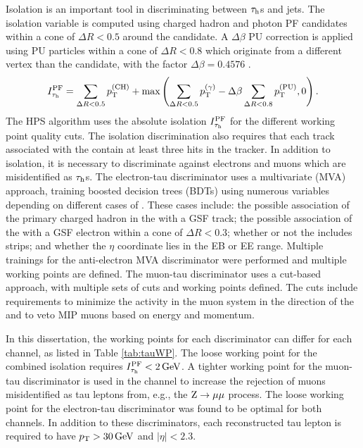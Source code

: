Isolation is an important tool in discriminating between $\tau_{\text{h}}$s and jets. The isolation variable is computed using charged hadron and photon PF candidates within a cone of $\Delta R < 0.5$ around the \tauh candidate. A $\Delta\beta$ PU correction is applied using PU particles within a cone of $\Delta R < 0.8$ which originate from a different vertex than the \tauh candidate, with the factor $\Delta\beta = 0.4576$ \cite{CMS-DP-2014-015}.
\begin{equation}
I^{\text{PF}}_{\tau_{\text{h}}} = \sum_{\Delta R < 0.5}{p_{\mathrm{T}}^{(\text{CH})}} + \text{max}\left( \sum_{\Delta R < 0.5}{p_{\mathrm{T}}^{(\gamma)}} - \Delta\beta \sum_{\Delta R < 0.8}{p_{\mathrm{T}}^{(\text{PU})}}, 0 \right).
\end{equation}
The HPS algorithm uses the absolute isolation $I^{\text{PF}}_{\tau_{\text{h}}}$ for the different working point quality cuts. The isolation discrimination also requires that each track associated with the \tauh contain at least three hits in the tracker. In addition to isolation, it is necessary to discriminate against electrons and muons which are misidentified as $\tau_{\text{h}}$s. The electron-tau discriminator uses a multivariate (MVA) approach, training boosted decision trees (BDTs) using numerous variables depending on different cases of \tauh. These cases include: the possible association of the primary charged hadron in the \tauh with a GSF track; the possible association of the \tauh with a GSF electron within a cone of $\Delta R < 0.3$; whether or not the \tauh includes strips; and whether the \tauh $\eta$ coordinate lies in the EB or EE range. Multiple trainings for the anti-electron MVA discriminator were performed and multiple working points are defined. The muon-tau discriminator uses a cut-based approach, with multiple sets of cuts and working points defined. The cuts include requirements to minimize the activity in the muon system in the direction of the \tauh and to veto MIP muons based on energy and momentum. 

In this dissertation, the working points for each discriminator can differ for each channel, as listed in Table \ref{tab:tauWP}. The loose working point for the combined isolation requires $I^{\text{PF}}_{\tau_{\text{h}}}<2\,\text{Ge\hspace{-.08em}V}$. A tighter working point for the muon-tau discriminator is used in the \mutau channel to increase the rejection of muons misidentified as tau leptons from, e.g., the $\mathrm{Z} \rightarrow \mu\mu$ process. The loose working point for the electron-tau discriminator was found to be optimal for both channels. In addition to these discriminators, each reconstructed tau lepton is required to have $p_{\mathrm{T}}>30\,\text{Ge\hspace{-.08em}V}$ and $|\eta|<2.3$.

